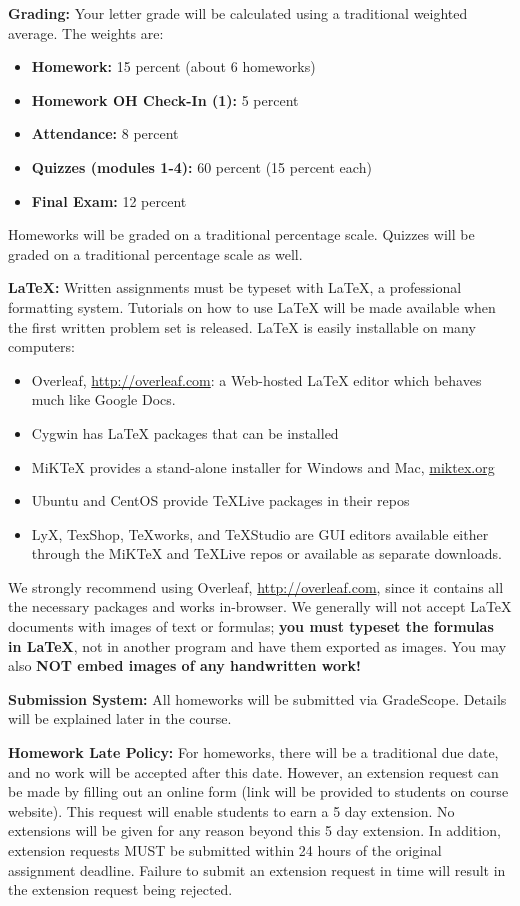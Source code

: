 \documentclass[12pt]{article}
\begin{document}
\textbf{Grading:} Your letter grade will be calculated using a traditional weighted average. The weights are:

\begin{itemize}
\item \textbf{Homework:} 15 percent (about 6 homeworks)
\item \textbf{Homework OH Check-In (1):} 5 percent
\item \textbf{Attendance:} 8 percent
\item \textbf{Quizzes (modules 1-4):} 60 percent (15 percent each)
\item \textbf{Final Exam:} 12 percent
\end{itemize}

Homeworks will be graded on a traditional percentage scale. Quizzes will be graded on a traditional percentage scale as well.


\textbf{\LaTeX:} Written assignments must be typeset with \LaTeX, a professional formatting system. Tutorials on how to use \LaTeX{} will be made available when the first written problem set is released. \LaTeX{} is easily installable on many computers: 
\begin{itemize}
    \item Overleaf, \url{http://overleaf.com}: a Web-hosted \LaTeX{} editor which behaves much like Google Docs.
    \item Cygwin has \LaTeX{} packages that can be installed
    \item MiKTeX provides a stand-alone installer for Windows and Mac, \url{miktex.org}
    \item Ubuntu and CentOS provide TeXLive packages in their repos
    \item LyX, TexShop, TeXworks, and TeXStudio are GUI editors available either through the MiKTeX and TeXLive repos or available as separate downloads.
\end{itemize}
We strongly recommend using Overleaf, \url{http://overleaf.com}, since it contains all the necessary packages and works in-browser. We generally will not accept \LaTeX{} documents with images of text or formulas; \textbf{you must typeset the formulas in \LaTeX}, not in another program and have them exported as images. You may also \textbf{NOT embed images of any handwritten work!}

\textbf{Submission System:} All homeworks will be submitted via GradeScope. Details will be explained later in the course. 

\textbf{Homework Late Policy:} For homeworks, there will be a traditional due date, and no work will be accepted after this date. However, an extension request can be made by filling out an online form (link will be provided to students on course website). This request will enable students to earn a 5 day extension. No extensions will be given for any reason beyond this 5 day extension. In addition, extension requests MUST be submitted within 24 hours of the original assignment deadline. Failure to submit an extension request in time will result in the extension request being rejected.
\end{document}
